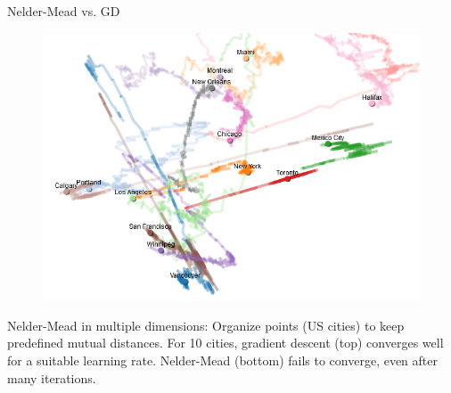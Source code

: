 \documentclass[11pt,compress,t,notes=noshow, xcolor=table]{beamer}
\begin{document}
\begin{vbframe}{Nelder-Mead vs. GD}
\begin{figure}
\begin{minipage}{0.45\textwidth}
    \end{minipage}\hfill
    \begin{minipage}{0.45\textwidth}
        \centering
        \includegraphics[width = 0.8\linewidth]{figure_man/nm_gd_cities_4.PNG}
    \end{minipage}
\end{figure}

\begin{footnotesize}
    Nelder-Mead in multiple dimensions:
    Organize points (US cities) to keep predefined mutual distances.
    For 10 cities, gradient descent (top) converges well for a suitable learning rate.
    Nelder-Mead (bottom) fails to converge, even after many iterations.
\end{footnotesize}



\end{vbframe}
\end{document}
